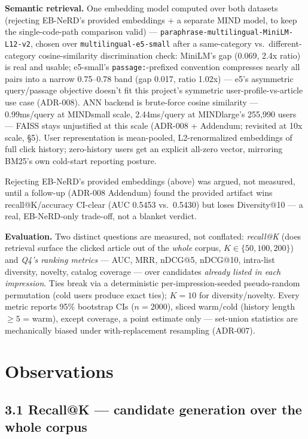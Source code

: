 \documentclass[10.5pt]{article}
\begin{document}
\begin{sloppypar}
\textbf{Semantic retrieval.} One embedding model computed over both datasets
(rejecting EB-NeRD's provided embeddings + a separate MIND model, to keep
the single-code-path comparison valid) --- \texttt{paraphrase-multilingual-MiniLM-L12-v2},
chosen over \texttt{multilingual-e5-small} after a
same-category vs.\ different-category cosine-similarity discrimination
check: MiniLM's gap (0.069, 2.4x ratio) is real and usable; e5-small's
\texttt{passage:}-prefixed convention compresses nearly all pairs into a
narrow 0.75--0.78 band (gap 0.017, ratio 1.02x) --- e5's asymmetric
query/passage objective doesn't fit this project's symmetric
user-profile-vs-article use case (ADR-008). ANN backend is brute-force
cosine similarity --- 0.99ms/query at MINDsmall scale, 2.44ms/query at
MINDlarge's 255{,}990 users --- FAISS stays unjustified at this scale
(ADR-008 + Addendum; revisited at 10x scale, \S5). User representation is
mean-pooled, L2-renormalized embeddings of full click history; zero-history
users get an explicit all-zero vector, mirroring BM25's own cold-start
reporting posture.
\end{sloppypar}

Rejecting EB-NeRD's provided embeddings (above) was argued, not measured,
until a follow-up (ADR-008 Addendum) found the provided artifact wins
recall@K/accuracy CI-clear (AUC 0.5453 vs.\ 0.5430) but loses Diversity@10
--- a real, EB-NeRD-only trade-off, not a blanket verdict.

\textbf{Evaluation.} Two distinct questions are measured, not conflated:
\emph{recall@K} (does retrieval surface the clicked article out of the
\emph{whole} corpus, $K \in \{50,100,200\}$) and \emph{Q4's ranking
metrics} --- AUC, MRR, nDCG@5, nDCG@10, intra-list diversity, novelty,
catalog coverage --- over candidates \emph{already listed in each
impression}. Ties break via a deterministic per-impression-seeded
pseudo-random permutation (cold users produce exact ties); $K=10$ for
diversity/novelty. Every metric reports 95\% bootstrap CIs ($n=2000$),
sliced warm/cold (history length $\geq 5$ = warm), except coverage, a
point estimate only --- set-union statistics are mechanically biased
under with-replacement resampling (ADR-007).

\section{Observations}

\subsection*{3.1 Recall@K --- candidate generation over the whole corpus}
\end{document}
